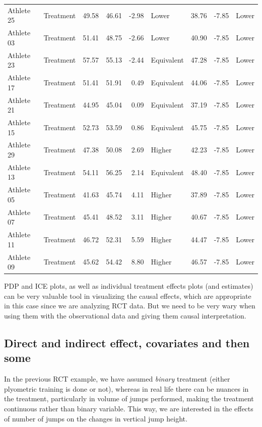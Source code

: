 \documentclass[
]{book}
\begin{document}
\begin{table}
\begin{tabular}[t]{llrrrlrrl}
Athlete 25 & Treatment & 49.58 & 46.61 & -2.98 & Lower & 38.76 & -7.85 & Lower\\
Athlete 03 & Treatment & 51.41 & 48.75 & -2.66 & Lower & 40.90 & -7.85 & Lower\\
\addlinespace
Athlete 23 & Treatment & 57.57 & 55.13 & -2.44 & Equivalent & 47.28 & -7.85 & Lower\\
Athlete 17 & Treatment & 51.41 & 51.91 & 0.49 & Equivalent & 44.06 & -7.85 & Lower\\
Athlete 21 & Treatment & 44.95 & 45.04 & 0.09 & Equivalent & 37.19 & -7.85 & Lower\\
Athlete 15 & Treatment & 52.73 & 53.59 & 0.86 & Equivalent & 45.75 & -7.85 & Lower\\
Athlete 29 & Treatment & 47.38 & 50.08 & 2.69 & Higher & 42.23 & -7.85 & Lower\\
\addlinespace
Athlete 13 & Treatment & 54.11 & 56.25 & 2.14 & Equivalent & 48.40 & -7.85 & Lower\\
Athlete 05 & Treatment & 41.63 & 45.74 & 4.11 & Higher & 37.89 & -7.85 & Lower\\
Athlete 07 & Treatment & 45.41 & 48.52 & 3.11 & Higher & 40.67 & -7.85 & Lower\\
Athlete 11 & Treatment & 46.72 & 52.31 & 5.59 & Higher & 44.47 & -7.85 & Lower\\
Athlete 09 & Treatment & 45.62 & 54.42 & 8.80 & Higher & 46.57 & -7.85 & Lower\\
\bottomrule
\end{tabular}
\end{table}

PDP and ICE plots, as well as individual treatment effects plots (and estimates) can be very valuable tool in visualizing the causal effects, which are appropriate in this case since we are analyzing RCT data. But we need to be very wary when using them with the observational data and giving them causal interpretation.

\hypertarget{direct-and-indirect-effect-covariates-and-then-some}{%
\subsection{Direct and indirect effect, covariates and then some}\label{direct-and-indirect-effect-covariates-and-then-some}}

In the previous RCT example, we have assumed \emph{binary} treatment (either plyometric training is done or not), whereas in real life there can be nuances in the treatment, particularly in volume of jumps performed, making the treatment continuous rather than binary variable. This way, we are interested in the effects of number of jumps on the changes in vertical jump height.
\end{document}
